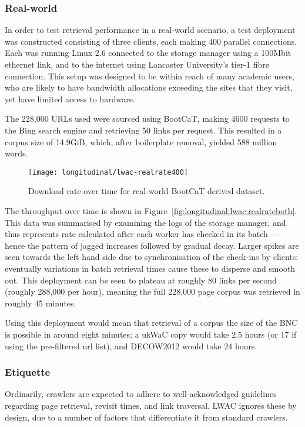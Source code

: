 \subsubsection{Real-world}

In order to test retrieval performance in a real-world scenario, a test deployment was constructed consisting of three clients, each making 400 parallel connections.  Each was running Linux 2.6 connected to the storage manager using a 100Mbit ethernet link, and to the internet using Lancaster University's tier-1 fibre connection.  This setup was designed to be within reach of many academic users, who are likely to have bandwidth allocations exceeding the sites that they visit, yet have limited access to hardware.


The 228,000 URLs used were sourced using BootCaT, making 4600 requests to the Bing search engine and retrieving 50 links per request.  This resulted in a corpus size of 14.9GiB, which, after boilerplate removal, yielded 588 million words.


\begin{figure}[Ht]
    \centering
    \texttt{[image: longitudinal/lwac-realrate400]}
    \caption{Download rate over time for real-world BootCaT derived dataset.}
    \label{fig:longitudinal:lwac:realrate400}
\end{figure}

The throughput over time is shown in Figure~\ref{fig:longitudinal:lwac:realrateboth}.  This data was summarised by examining the logs of the storage manager, and thus represents rate calculated after each worker has checked in its batch --- hence the pattern of jagged increases followed by gradual decay.  Larger spikes are seen towards the left hand side due to synchronisation of the check-ins by clients: eventually variations in batch retrieval times cause these to disperse and smooth out.  This deployment can be seen to plateau at roughly 80 links per second (roughly 288,000 per hour), meaning the full 228,000 page corpus was retrieved in roughly 45 minutes.

Using this deployment would mean that retrieval of a corpus the size of the BNC is possible in around eight minutes; a ukWaC copy would take 2.5 hours (or 17 if using the pre-filtered url list), and DECOW2012 would take 24 hours. 





\subsubsection{Etiquette}
Ordinarily, crawlers are expected to adhere to well-acknowledged guidelines regarding page retrieval, revisit times, and link traversal.  LWAC ignores these by design, due to a number of factors that differentiate it from standard crawlers.

